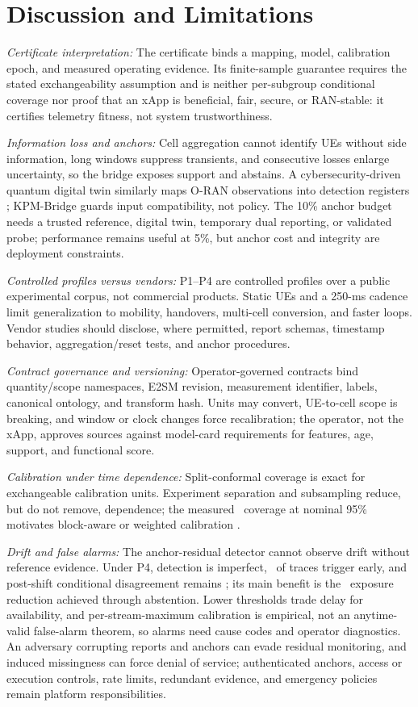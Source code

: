 \documentclass[10pt,journal,twoside]{IEEEtran}
\begin{document}
\section{Discussion and Limitations}
\emph{Certificate interpretation:}
The certificate binds a mapping, model, calibration epoch, and measured operating evidence. Its finite-sample guarantee requires the stated exchangeability assumption and is neither per-subgroup conditional coverage nor proof that an xApp is beneficial, fair, secure, or RAN-stable: it certifies telemetry fitness, not system trustworthiness.

\emph{Information loss and anchors:}
Cell aggregation cannot identify UEs without side information, long windows suppress transients, and consecutive losses enlarge uncertainty, so the bridge exposes support and abstains. A cybersecurity-driven quantum digital twin similarly maps O-RAN observations into detection registers \cite{alkarawi2026cqdt}; KPM-Bridge guards input compatibility, not policy. The 10\% anchor budget needs a trusted reference, digital twin, temporary dual reporting, or validated probe; performance remains useful at 5\%, but anchor cost and integrity are deployment constraints.

\emph{Controlled profiles versus vendors:}
P1--P4 are controlled profiles over a public experimental corpus, not commercial products. Static UEs and a 250-ms cadence limit generalization to mobility, handovers, multi-cell conversion, and faster loops. Vendor studies should disclose, where permitted, report schemas, timestamp behavior, aggregation/reset tests, and anchor procedures.

\emph{Contract governance and versioning:}
Operator-governed contracts bind quantity/scope namespaces, E2SM revision, measurement identifier, labels, canonical ontology, and transform hash. Units may convert, UE-to-cell scope is breaking, and window or clock changes force recalibration; the operator, not the xApp, approves sources against model-card requirements for features, age, support, and functional score.

\emph{Calibration under time dependence:}
Split-conformal coverage is exact for exchangeable calibration units. Experiment separation and subsampling reduce, but do not remove, dependence; the measured \StableCoverage\ coverage at nominal 95\% motivates block-aware or weighted calibration \cite{barber2023exchangeability}.

\emph{Drift and false alarms:}
The anchor-residual detector cannot observe drift without reference evidence. Under P4, detection is imperfect, \DriftFalseAlarm\ of traces trigger early, and post-shift conditional disagreement remains \DriftSelectiveError; its main benefit is the \DriftExposureReduction\ exposure reduction achieved through abstention. Lower thresholds trade delay for availability, and per-stream-maximum calibration is empirical, not an anytime-valid false-alarm theorem, so alarms need cause codes and operator diagnostics. An adversary corrupting reports and anchors can evade residual monitoring, and induced missingness can force denial of service; authenticated anchors, access or execution controls, rate limits, redundant evidence, and emergency policies remain platform responsibilities.
\end{document}
